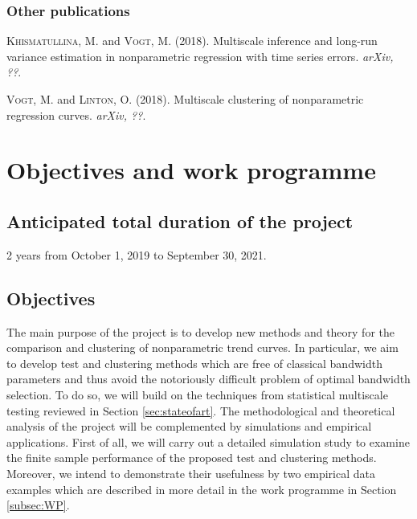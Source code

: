 \documentclass[a4paper,12pt]{article}
\begin{document}
\subsubsection{Other publications}


{\small

\hangindent=0.4cm \textsc{Khismatullina}, M. and \textsc{Vogt}, M. (2018). Multiscale inference and long-run variance estimation in nonparametric regression with time series errors. \textit{arXiv, ??}.

\vspace{5pt}

\noindent \hangindent=0.4cm \textsc{Vogt}, M. and \textsc{Linton}, O. (2018). Multiscale clustering of nonparametric regression curves. \textit{arXiv, ??}. 

}



\newpage
\section{Objectives and work programme}\label{sec:objWP}


\subsection{Anticipated total duration of the project}


2 years from October 1, 2019 to September 30, 2021.


\subsection{Objectives}\label{subsec:objectives}


The main purpose of the project is to develop new methods and theory for the comparison and clustering of nonparametric trend curves. In particular, we aim to develop test and clustering methods which are free of classical bandwidth para\-meters and thus avoid the notoriously difficult problem of optimal bandwidth selection. 
To do so, we will build on the techniques from statistical multiscale testing reviewed in Section \ref{sec:stateofart}. The methodological and theoretical analysis of the project will be complemented by simulations and empirical applications. First of all, we will carry out a detailed simulation study to examine the finite sample performance of the proposed test and clustering methods. Moreover, we intend to demonstrate their usefulness by two empirical data examples which are described in more detail in the work programme in Section \ref{subsec:WP}. 
\end{document}
